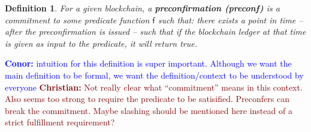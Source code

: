 \documentclass[a4paper]{article}
\theoremstyle{boldstyle}
\newtheorem{definitionx}{Definition}
\newenvironment{definition}
  {\begin{defopenboxq}\begin{definitionx}}
  {\end{definitionx}\end{defopenboxq}}
\newcommand{\cm}[1]{\textcolor{blue}{\textbf{Conor:} #1}}
\newcommand{\chm}[1]{\textcolor{Maroon}{\textbf{Christian:} #1}}
\begin{document}
    
    
    
    

        \begin{definition}
        \label{def:preconfer}
        For a given blockchain, a \textbf{preconfirmation (preconf)} is a commitment to some predicate function $\mathsf{f}$ such that: there exists a point in time -- after the preconfirmation is issued -- such that if the blockchain ledger at that time is given as input to the predicate, it will return true. 
        \end{definition}

        \cm{intuition for this definition is super important. Although we want the main definition to be formal, we want the definition/context to be understood by everyone} 
        \chm{Not really clear what ``commitment'' means in this context. Also seems too strong to require the predicate to be satisified. Preconfers can break the commitment. Maybe slashing should be mentioned here instead of a strict fulfillment requirement?}
        
\end{document}
